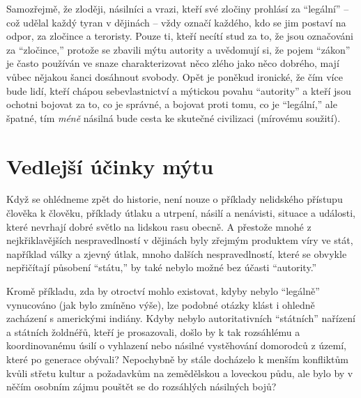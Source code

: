 \documentclass{book}
\begin{document}
Samozřejmě, že zloději, násilníci a vrazi, kteří své zločiny prohlásí za \enquote{legální} -- což udělal každý tyran v dějinách -- vždy označí každého, kdo se jim postaví na odpor, za zločince a teroristy. Pouze ti, kteří necítí stud za to, že jsou označováni za \enquote{zločince,} protože se zbavili mýtu autority a uvědomují si, že pojem \enquote{zákon} je často používán ve snaze charakterizovat něco zlého jako něco dobrého, mají vůbec nějakou šanci dosáhnout svobody. Opět je poněkud ironické, že čím více bude lidí, kteří chápou sebevlastnictví a mýtickou povahu \enquote{autority} a kteří jsou ochotni bojovat za to, co je správné, a bojovat proti tomu, co je \enquote{legální,} ale špatné, tím \emph{méně} násilná bude cesta ke skutečné civilizaci (mírovému soužití).

\section{Vedlejší účinky mýtu}

Když se ohlédneme zpět do historie, není nouze o příklady nelidského přístupu člověka k člověku, příklady útlaku a utrpení, násilí a nenávisti, situace a události, které nevrhají dobré světlo na lidskou rasu obecně. A přestože mnohé z nejkřiklavějších nespravedlností v dějinách byly zřejmým produktem víry ve stát, například války a zjevný útlak, mnoho dalších nespravedlností, které se obvykle nepřičítají působení \enquote{státu,} by také nebylo možné bez účasti \enquote{autority.}

Kromě příkladu, zda by otroctví mohlo existovat, kdyby nebylo \enquote{legálně} vynucováno (jak bylo zmíněno výše), lze podobné otázky klást i ohledně zacházení s americkými indiány. Kdyby nebylo autoritativních \enquote{státních} nařízení a státních žoldnéřů, kteří je prosazovali, došlo by k tak rozsáhlému a koordinovanému úsilí o vyhlazení nebo násilné vystěhování domorodců z území, které po generace obývali? Nepochybně by stále docházelo k menším konfliktům kvůli střetu kultur a požadavkům na zemědělskou a loveckou půdu, ale bylo by v něčím osobním zájmu pouštět se do rozsáhlých násilných bojů?
\end{document}
